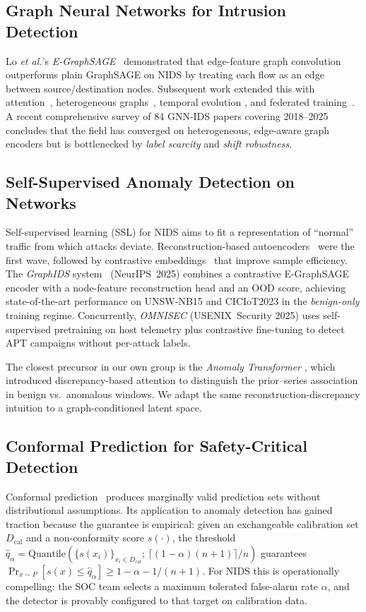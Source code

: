 \documentclass[journal,twoside]{IEEEtran}
\begin{document}
\subsection{Graph Neural Networks for Intrusion Detection}
Lo \emph{et al.}'s \emph{E-GraphSAGE}~\cite{lo2022} demonstrated that
edge-feature graph convolution outperforms plain GraphSAGE on NIDS by
treating each flow as an edge between source/destination nodes.
Subsequent work extended this with attention~\cite{caville2022anomalE},
heterogeneous graphs~\cite{li2024hgnnids}, temporal evolution
\cite{liu2023tgcnids}, and federated training~\cite{wang2024fedgnn}.
A recent comprehensive survey of 84 GNN-IDS papers covering 2018--2025
\cite{zhao2025gnnsurvey} concludes that the field has converged on
heterogeneous, edge-aware graph encoders but is bottlenecked by
\emph{label scarcity} and \emph{shift robustness}.

\subsection{Self-Supervised Anomaly Detection on Networks}
Self-supervised learning (SSL) for NIDS aims to fit a representation of
``normal'' traffic from which attacks deviate.  Reconstruction-based
autoencoders~\cite{caville2022anomalE,kasim2022aess} were the first wave,
followed by contrastive
embeddings~\cite{ding2022simgrace,liu2023ssgad} that improve sample
efficiency.  The \emph{GraphIDS} system~\cite{nguyen2025graphids}
(NeurIPS~2025) combines a contrastive E-GraphSAGE encoder with a
node-feature reconstruction head and an OOD score, achieving
state-of-the-art performance on UNSW-NB15 and CICIoT2023 in the
\emph{benign-only} training regime.  Concurrently, \emph{OMNISEC}
\cite{omnisec2025} (USENIX~Security 2025) uses self-supervised pretraining
on host telemetry plus contrastive fine-tuning to detect APT campaigns
without per-attack labels.

The closest precursor in our own group is the \emph{Anomaly Transformer}
\cite{xu2022anomalyTrans}, which introduced discrepancy-based attention to
distinguish the prior--series association in benign vs.\ anomalous
windows.  We adapt the same reconstruction-discrepancy intuition to a
graph-conditioned latent space.

\subsection{Conformal Prediction for Safety-Critical Detection}
Conformal prediction~\cite{vovk2005,angelopoulos2023gentleconformal}
produces marginally valid prediction sets without distributional
assumptions.  Its application to anomaly detection
\cite{bates2023icad,xu2024conformaloos} has gained traction because the
guarantee is empirical: given an exchangeable calibration set
$D_\text{cal}$ and a non-conformity score $s(\cdot)$, the threshold
$\hat{q}_\alpha = \mathrm{Quantile}\!\left( \{ s(x_i) \}_{x_i \in
D_\text{cal}};\, \lceil (1{-}\alpha)(n{+}1) \rceil / n \right)$ guarantees
$\Pr_{x \sim P}[s(x) \le \hat{q}_\alpha] \ge 1{-}\alpha - 1/(n{+}1)$.
For NIDS this is operationally compelling: the SOC team selects a
maximum tolerated false-alarm rate $\alpha$, and the detector is provably
configured to that target on calibration data.
\end{document}
